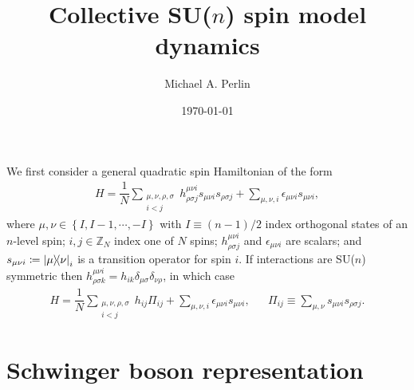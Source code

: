 \documentclass[nofootinbib,notitlepage,11pt]{revtex4-2}
\newcommand{\f}[2]{\dfrac{#1}{#2}} %
\newcommand{\p}[1]{\left(#1\right)} %
\renewcommand{\set}[1]{\left\{#1\right\}} %
\renewcommand{\i}{\mathrm{i}\mkern1mu} %
\newcommand{\1}{\mathds{1}}
\newcommand{\ZZ}{\mathbb{Z}}
\begin{document}
\thispagestyle{fancy}


\title{Collective SU($n$) spin model dynamics}%
\author{Michael A. Perlin}%
\date{\today}

\maketitle

We first consider a general quadratic spin Hamiltonian of the form
\begin{align}
  H = \f1N \sum_{\substack{\mu,\nu,\rho,\sigma\\i<j}}
  h^{\mu\nu i}_{\rho\sigma j} s_{\mu\nu i} s_{\rho\sigma j}
  + \sum_{\mu,\nu,i} \epsilon_{\mu\nu i} s_{\mu\nu i},
  \label{eq:spin}
\end{align}
where $\mu,\nu\in\set{I,I-1,\cdots,-I}$ with $I\equiv\p{n-1}/2$ index orthogonal states of an $n$-level spin; $i,j\in\ZZ_N$ index one of $N$ spins; $h^{\mu\nu i}_{\rho\sigma j}$ and $\epsilon_{\mu\nu i}$ are scalars; and $s_{\mu\nu i}\coloneqq\op{\mu}{\nu}_i$ is a transition operator for spin $i$.
If interactions are SU($n$) symmetric then $h^{\mu\nu i}_{\rho\sigma k} = h_{ik} \delta_{\mu\sigma}\delta_{\nu\rho}$, in which case
\begin{align}
  H = \f1N \sum_{\substack{\mu,\nu,\rho,\sigma\\i<j}}
  h_{ij} \Pi_{ij}
  + \sum_{\mu,\nu,i} \epsilon_{\mu\nu i} s_{\mu\nu i},
  &&
  \Pi_{ij} \equiv \sum_{\mu,\nu} s_{\mu\nu i} s_{\rho\sigma j}.
  \label{eq:spin_sun}
\end{align}

\section{Schwinger boson representation}
\end{document}
